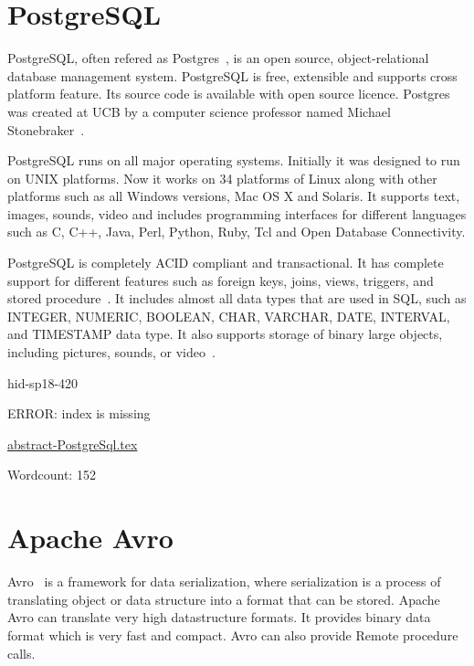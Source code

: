 \section{PostgreSQL}

PostgreSQL, often refered as Postgres~\cite{hid-sp18-420-PostgreSQL_About}, is an
open source, object-relational database management system. PostgreSQL is free,
extensible and supports cross platform feature. Its source code is available
with open source licence. Postgres was created at UCB by a computer science
professor named Michael Stonebraker~\cite{hid-sp18-420-PostgreSQL_History}.

PostgreSQL runs on all major operating systems. Initially it was designed to run
on UNIX platforms. Now it works on 34 platforms of Linux along with other
platforms such as all Windows versions, Mac OS X and Solaris. It supports text,
images, sounds, video and includes programming interfaces for different
languages such as C, C++, Java, Perl, Python, Ruby, Tcl and Open Database
Connectivity.

PostgreSQL is completely ACID compliant and transactional. It has complete
support for different features such as foreign keys, joins, views, triggers, and
stored procedure~\cite{hid-sp18-420-PostgreSQL_Wiki}. It includes almost all
data types that are used in SQL, such as INTEGER, NUMERIC, BOOLEAN, CHAR,
VARCHAR, DATE, INTERVAL, and TIMESTAMP data type. It also supports storage of binary large
objects, including pictures, sounds, or
video~\cite{hid-sp18-420-PostgreSQL_About}.


\begin{IU}

hid-sp18-420

ERROR: index is missing

\href{https://github.com/cloudmesh-community/hid-sp18-420/blob/master//technology/abstract-PostgreSql.tex}{abstract-PostgreSql.tex}

 

Wordcount: 152

\end{IU}

\section{Apache Avro}

Avro~\cite{hid-sp18-421-AvroCloud} is a framework for data serialization, where
serialization is a process of translating object or data structure into a format
that can be stored. Apache Avro can translate very high datastructure formats.
It provides binary data format which is very fast and compact. Avro can also
provide Remote procedure calls.

